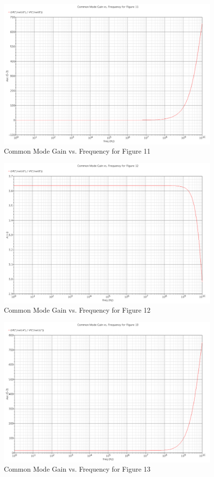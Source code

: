 \documentclass{article}
\begin{document}
\begin{figure}[H]
\centering
\includegraphics[width=6in]{p3_3a}
\caption{Common Mode Gain vs. Frequency for Figure 11}
\label{3_3a_gain}
\end{figure}

\begin{figure}[H]
\centering
\includegraphics[width=6in]{p3_3b}
\caption{Common Mode Gain vs. Frequency for Figure 12}
\label{3_3b_gain}
\end{figure}

\begin{figure}[H]
\centering
\includegraphics[width=6in]{p3_3c}
\caption{Common Mode Gain vs. Frequency for Figure 13}
\label{3_3c_gain}
\end{figure}
\end{document}
